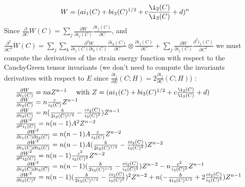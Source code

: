 \documentclass[a4paper,11pt,english]{sphinxmanual}
\begin{document}
\subsubsection{}
\label{\detokenize{userdoc/model_nonlinear_elasticity:generalized-blatz-ko-law}}\begin{equation*}
\begin{split}{W} &= (ai_1(C) + bi_3(C)^{1/2} + c\frac{\i_2(C)}{\i_3(C)} + d)^n\end{split}
\end{equation*}
Since \(\frac{\partial}{\partial C} {W}(C) = \displaystyle\sum_{j}\frac{\partial W}{\partial i_j(C)} \frac{\partial i_j(C)}{\partial C}\), and \(\frac{\partial^2}{\partial C^2} {W}(C) = \displaystyle\sum_{j} \displaystyle\sum_{k} \frac{\partial^2 W}{\partial i_j(C) \partial i_k(C)} \frac{\partial i_k(C)}{\partial C} \otimes \frac{\partial i_j(C)}{\partial C} + \displaystyle\sum_{j} \frac{\partial W}{\partial i_j(C)} \frac{\partial^2 i_j(C)}{\partial C^2}\) we must compute the derivatives of the strain energy function with respect to the Cauchy\sphinxhyphen{}Green tensor invariants (we don’t need to compute the invariants derivatives with respect to \(E\) since \(\frac{\partial i_j}{\partial E}(C;H) = 2 \frac{\partial i_j}{\partial C}(C;H)\)) :
\begin{equation*}
\begin{split}\begin{array}{l}
\frac{\partial W}{\partial i_1(C)} = naZ^{n-1}
~~~~\mbox{with } Z = (ai_1(C) + bi_3(C)^{1/2} + c\frac{\i_2(C)}{\i_3(C)} + d)\\
\frac{\partial W}{\partial i_2(C)} = n\frac{c}{i_3(C)}Z^{n-1}\\
\frac{\partial W}{\partial i_3(C)} = n(\frac{b}{2i_3(C)^{1/2}}-\frac{ci_2(C)}{i_3(C)^2})Z^{n-1}\\
\frac{\partial W^2}{\partial^2 i_1(C)} = n(n-1)A^2Z^{n-2}\\
\frac{\partial W^2}{\partial i_1(C) \partial i_2(C)} = n(n-1)A\frac{c}{i_3(C)}Z^{n-2}\\
\frac{\partial W^2}{\partial i_1(C) \partial i_3(C)} = n(n-1)A(\frac{b}{2i_3(C)^{1/2}}-\frac{ci_2(C)}{i_3(C)^2})Z^{n-2}\\
\frac{\partial W^2}{\partial^2 i_2(C)} = n(n-1)\frac{c^2}{i_3(C)^2}Z^{n-2}\\
\frac{\partial W^2}{\partial i_2(C) \partial i_3(C)} = n(n-1)(\frac{b}{2i_3(C)^{1/2}}-\frac{ci_2(C)}{i_3(C)^2})Z^{n-2} - n\frac{c^2}{i_3(C)^2}Z^{n-1}\\
\frac{\partial W^2}{\partial i_3(C)^2} = n(n-1)(\frac{b}{2i_3(C)^{1/2}}-\frac{ci_2(C)}{i_3(C)^2})^2Z^{n-2} + n(-\frac{b}{4i_3(C)^{3/2}}+2\frac{ci_2(C)}{i_3(C)^4})Z^{n-1}
\end{array}\end{split}
\end{equation*}
\end{document}
